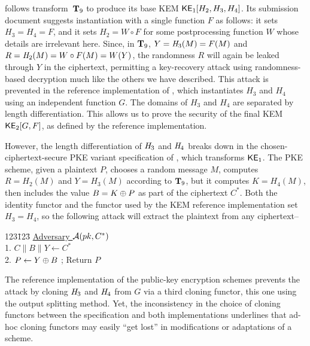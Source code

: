 \medskip

\cite{nistpqc:Lizard}
follows transform~$\mathbf{T}_9$ to produce its base KEM ${\mathsf{KE}}_1[H_2,\allowbreak H_3,\allowbreak H_4]$. Its submission document suggests instantiation with a single function $F$ as follows: it sets $H_3 = H_4 = F$, and it sets $H_2 = W \circ F$ for some postprocessing function $W$ whose details are irrelevant here.
Since, in $\mathbf{T}_9$, $Y = \mathit{H}_3(M) = F(M)$ and $R = \mathit{H}_2(M) = W\circ F (M) = W(Y)$, the randomness $R$ will again be leaked through $Y$ in the ciphertext, permitting a key-recovery attack using randomness-based decryption much like the others we have described. This attack is prevented in the reference implementation of , which instantiates $H_3$ and $H_4$ using an independent function $G$. The domains of $H_3$ and $H_4$ are separated by length differentiation. This allows us to prove the security of the final KEM ${\mathsf{KE}}_2[G,F]$, as defined by the reference implementation.

However, the length differentiation of $\mathit{H}_3$ and $\mathit{H}_4$ breaks down in the chosen-ciphertext-secure PKE variant specification of , which transforms ${\mathsf{KE}}_1$. The PKE scheme, given a plaintext $P$, chooses a random message $M$, computes $R=H_2(M)$ and $Y=H_3(M)$ according to $\mathbf{T}_9$, but it computes $K = H_4(M)$, then includes the value $B = K \oplus P$ as part of the ciphertext $C^*$.
Both the identity functor and the functor used by the KEM reference implementation set $H_3 = H_4$, so the following attack will extract the plaintext from any ciphertext--
\begin{tabbing}
	123\=123\=\kill
	\underline{Adversary $\mathcal{A}(pk,C^*)$}  \\[2pt]
	1. \> $C\|B\|Y\gets C^*$ \\ 
	2. \> $P\gets Y \oplus B$ ; Return $P$ 
\end{tabbing}

The reference implementation of the public-key encryption schemes prevents the attack by cloning $\mathit{H}_3$ and $\mathit{H}_4$ from $G$ via a third cloning functor, this one using the output splitting method. 
Yet, the inconsistency in the choice of cloning functors between the specification and both implementations underlines that ad-hoc cloning functors may easily ``get lost'' in modifications or adaptations of a scheme.

